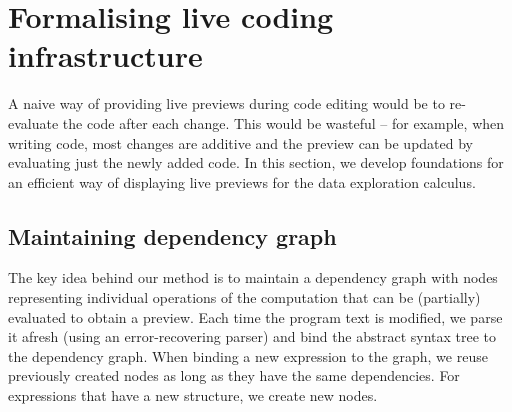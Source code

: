 \documentclass[acmsmall,anonymous,fleqn]{acmart}\settopmatter{printfolios=false,printccs=false,printacmref=false}
\theoremstyle{plain}
\theoremstyle{definition}
\newcommand{\ident}[1]{\textnormal{\textcolor{idclr}{\sffamily #1}}}
\begin{document}
%
%
%
%


\section{Formalising live coding infrastructure}
\label{sec:formal}

A naive way of providing live previews during code editing would be to re-evaluate the code
after each change. This would be wasteful -- for example, when writing
code, most changes are additive and the preview can be updated by evaluating just the newly added
code. In this section, we develop foundations for an efficient way of displaying live previews
for the data exploration calculus.


\subsection{Maintaining dependency graph}
\label{sec:formal-deps}

The key idea behind our method is to maintain a dependency graph \cite{dependencies} with
nodes representing individual operations of the computation that can be (partially) evaluated
to obtain a preview. Each time the program text is modified, we parse it afresh (using an
error-recovering parser) and bind the abstract syntax tree to the dependency graph.
When binding a new expression to the graph, we reuse previously created nodes as long as
they have the same dependencies. For expressions that have a new structure, we create new nodes.
\end{document}

